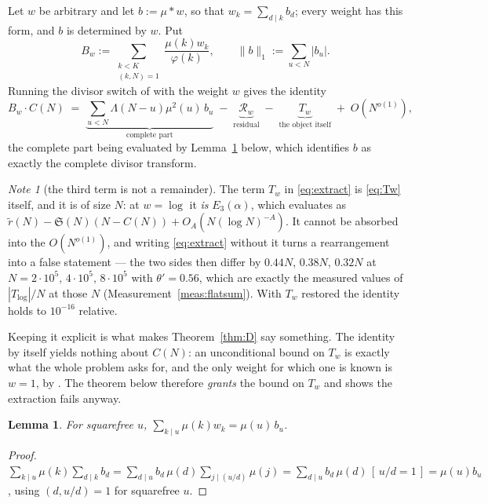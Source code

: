 \documentclass[11pt,a4paper]{article}
\theoremstyle{plain}
\newtheorem{lemma}[theorem]{Lemma}
\theoremstyle{definition}
\theoremstyle{remark}
\newtheorem{note}[theorem]{Note}
\renewcommand{\SS}{\mathfrak{S}}
\begin{document}
Let $w$ be arbitrary and let $b:=\mu*w$, so that
$w_k=\sum_{d\mid k}b_d$; every weight has this form, and $b$ is
determined by $w$. Put
\begin{equation}\label{eq:Bw}
  B_w:=\sum_{\substack{k<K\\(k,N)=1}}\frac{\mu(k)w_k}{\varphi(k)},
  \qquad
  \|b\|_1:=\sum_{u<N}|b_u| .
\end{equation}
Running the divisor switch of \cite{P1} with the weight $w$ gives the
identity
\begin{equation}\label{eq:extract}
  B_w\cdot C(N)\;=\;
  \underbrace{\sum_{u<N}\Lambda(N-u)\mu^2(u)\,b_u}_{\text{complete part}}
  \;-\;\underbrace{\mathcal R_w}_{\text{residual}}
  \;-\;\underbrace{T_w}_{\text{the object itself}}
  \;+\;O\!\left(N^{o(1)}\right),
\end{equation}
the complete part being evaluated by Lemma~\ref{lem:Gb} below, which
identifies $b$ as exactly the complete divisor transform.

\begin{note}[the third term is not a remainder]\label{note:Tw}
The term $T_w$ in \eqref{eq:extract} is \eqref{eq:Tw} itself, and it is
of size $N$: at $w=\log$ it \emph{is} $E_3(\alpha)$, which
\cite[Thm.~3]{P1} evaluates as
$\tilde r(N)-\SS(N)(N-C(N))+O_A(N(\log N)^{-A})$. It cannot be absorbed
into the $O(N^{o(1)})$, and writing \eqref{eq:extract} without it turns
a rearrangement into a false statement --- the two sides then differ by
$0.44N$, $0.38N$, $0.32N$ at $N=2\cdot10^5,\,4\cdot10^5,\,8\cdot10^5$
with $\theta'=0.56$, which are exactly the measured values of
$|T_{\log}|/N$ at those $N$ (Measurement~\ref{meas:flatsum}). With
$T_w$ restored the identity holds to $10^{-16}$ relative.

Keeping it explicit is what makes Theorem~\ref{thm:D} say something.
The identity by itself yields nothing about $C(N)$: an unconditional
bound on $T_w$ is exactly what the whole problem asks for, and the only
weight for which one is known is $w=1$, by \cite[Thm.~1]{P1}. The
theorem below therefore \emph{grants} the bound on $T_w$ and shows the
extraction fails anyway.
\end{note}

\begin{lemma}\label{lem:Gb}
For squarefree $u$, $\sum_{k\mid u}\mu(k)w_k=\mu(u)\,b_u$.
\end{lemma}

\begin{proof}
$\sum_{k\mid u}\mu(k)\sum_{d\mid k}b_d
 =\sum_{d\mid u}b_d\,\mu(d)\sum_{j\mid(u/d)}\mu(j)
 =\sum_{d\mid u}b_d\,\mu(d)\,[\,u/d=1\,]=\mu(u)b_u$,
using $(d,u/d)=1$ for squarefree $u$.
\end{proof}
\end{document}
